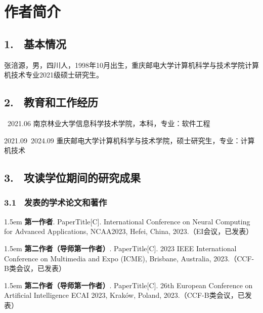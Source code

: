 \specialsectioning


\chapter{作者简介}
\thispagestyle{others}
\pagestyle{others}
\xiaosi


\section{1. \ 基本情况}

\ifAnonymity

\else
张涪源，男，四川人，1998年10月出生，重庆邮电大学计算机科学与技术学院计算机技术专业2021级硕士研究生。

\fi
\section{2. \ 教育和工作经历}

\ifAnonymity
{}~2021.06 南京林业大学信息科学技术学院，本科，专业：软件工程

2021.09~2024.09 重庆邮电大学计算机科学与技术学院，硕士研究生，专业：计算机技术


\fi

\section{3. \ 攻读学位期间的研究成果}


\subsection{3.1 \ 发表的学术论文和著作}


\ifAnonymity

\hangindent 1.5em
\noindent
[1] \textbf{第一作者}. PaperTitle[C]. International Conference on Neural Computing for Advanced Applications, NCAA2023, Hefei, China, 2023.（EI会议，已发表）

\hangindent 1.5em
\noindent
[2]\textbf{第二作者（导师第一作者）}. PaperTitle[C]. 2023 IEEE International Conference on Multimedia and Expo (ICME), Brisbane, Australia, 2023.（CCF-B类会议，已发表）

\hangindent 1.5em
\noindent
[3]\textbf{第二作者（导师第一作者）}. PaperTitle[C]. 26th European Conference on Artificial Intelligence ECAI 2023, Kraków, Poland, 2023.（CCF-B类会议，已发表）

\else


